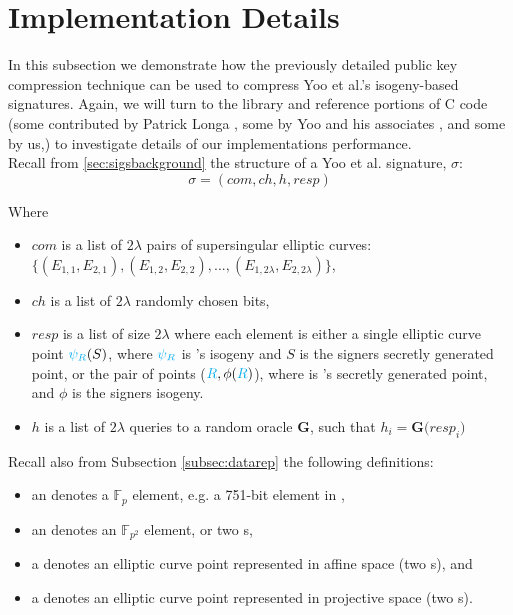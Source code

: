 \section{Implementation Details}
\label{sec:compimplementation}

In this subsection we demonstrate how the previously detailed public key compression technique can be used to compress Yoo et al.'s isogeny-based signatures. Again, we will turn to the \sidh library and reference portions of C code (some contributed by Patrick Longa \cite{sidhcode}, some by Yoo and his associates \cite{yoosigcode}, and some by us,) to investigate details of our implementations performance.\\

\noindent
Recall from \ref{sec:sigsbackground} the structure of a Yoo et al. signature, $\sigma$:
$$
\sigma = (com, ch, h, resp)
$$

\noindent
Where

\begin{itemize}
\item $com$ is a list of $2\lambda$ pairs of supersingular elliptic curves: $\{(E_{1,1}, E_{2,1}), (E_{1,2}, E_{2,2}), ..., (E_{1,2\lambda}, E_{2,2\lambda})\}$,
\item $ch$ is a list of $2\lambda$ randomly chosen bits,
\item $resp$ is a list of size $2\lambda$ where each element is either a single elliptic curve point $\textcolor{cyan}{\psi_R}(S)$, where $\textcolor{cyan}{\psi_R}$ is \randall's isogeny and $S$ is the signers secretly generated point, or the pair of points ($\textcolor{cyan}{R}, \phi(\textcolor{cyan}{R})$), where \cyr is \randall's secretly generated point, and $\phi$ is the signers isogeny.
\item $h$ is a list of $2\lambda$ queries to a random oracle \textbf{G}, such that $h_{i} = \textbf{G(}resp_{i}\textbf{)}$
\end{itemize}

\noindent
Recall also from Subsection \ref{subsec:datarep} the following definitions:
\begin{itemize}
\item an  denotes a $\mathbb{F}_{p}$ element, e.g. a 751-bit element in \sidh,
\item an  denotes an $\mathbb{F}_{p^2}$ element, or two s,
\item a  denotes an elliptic curve point represented in affine space (two s), and
\item a  denotes an elliptic curve point represented in projective space (two s).
\end{itemize}

